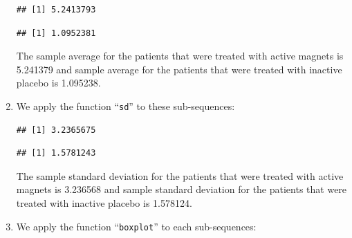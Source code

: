 \documentclass[]{krantz}
\makeatletter
\newenvironment{Shaded}{\begin{snugshade}}{\end{snugshade}}
\newcommand{\KeywordTok}[1]{\textcolor[rgb]{0.13,0.29,0.53}{\textbf{#1}}}
\newcommand{\DecValTok}[1]{\textcolor[rgb]{0.00,0.00,0.81}{#1}}
\newcommand{\OperatorTok}[1]{\textcolor[rgb]{0.81,0.36,0.00}{\textbf{#1}}}
\newcommand{\NormalTok}[1]{#1}
\newenvironment{kframe}{%
\medskip{}
\setlength{\fboxsep}{.8em}
 \def\at@end@of@kframe{}%
 \ifinner\ifhmode%
  \def\at@end@of@kframe{\end{minipage}}%
  \begin{minipage}{\columnwidth}%
 \fi\fi%
 \def\FrameCommand##1{\hskip\@totalleftmargin \hskip-\fboxsep
 \colorbox{shadecolor}{##1}\hskip-\fboxsep
     \hskip-\linewidth \hskip-\@totalleftmargin \hskip\columnwidth}%
 \MakeFramed {\advance\hsize-\width
   \@totalleftmargin\z@ \linewidth\hsize
   \@setminipage}}%
 {\par\unskip\endMakeFramed%
 \at@end@of@kframe}
\renewenvironment{Shaded}{\begin{kframe}}{\end{kframe}}
\theoremstyle{definition}
\theoremstyle{definition}
\theoremstyle{definition}
\theoremstyle{remark}
\makeatother
\begin{document}
\begin{enumerate}
\begin{verbatim}
## [1] 5.2413793
\end{verbatim}

\begin{Shaded}
\end{Shaded}

\begin{verbatim}
## [1] 1.0952381
\end{verbatim}

  The sample average for the patients that were treated with active
  magnets is 5.241379 and sample average for the patients that were
  treated with inactive placebo is 1.095238.
\item
  We apply the function ``\texttt{sd}'' to these sub-sequences:

\begin{Shaded}
\end{Shaded}

\begin{verbatim}
## [1] 3.2365675
\end{verbatim}

\begin{Shaded}
\end{Shaded}

\begin{verbatim}
## [1] 1.5781243
\end{verbatim}

  The sample standard deviation for the patients that were treated with
  active magnets is 3.236568 and sample standard deviation for the
  patients that were treated with inactive placebo is 1.578124.
\item
  We apply the function ``\texttt{boxplot}'' to each sub-sequences:

\begin{Shaded}
\end{Shaded}


\end{enumerate}
\end{document}
